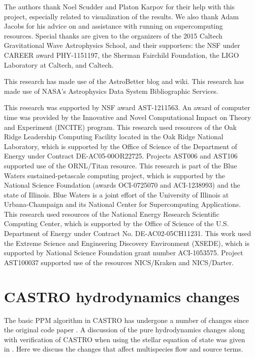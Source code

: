 \documentclass[iop]{../emulateapj}
\begin{document}
The authors thank Noel Scudder and Platon Karpov for their help with 
this project, especially related to visualization of the results. 
We also thank Adam Jacobs for his advice on and assistance with 
running on supercomputing resources. Special thanks are given 
to the organizers of the 2015 Caltech Gravitational Wave 
Astrophysics School, and their supporters: the NSF 
under CAREER award PHY-1151197, the Sherman Fairchild 
Foundation, the LIGO Laboratory at Caltech, and Caltech.

This research has made use of the AstroBetter blog and wiki. 
This research has made use of NASA's Astrophysics Data System 
Bibliographic Services.

This research was supported by NSF award AST-1211563. An
award of computer time was provided by the Innovative and Novel
Computational Impact on Theory and Experiment (INCITE) program.  This
research used resources of the Oak Ridge Leadership Computing Facility
located in the Oak Ridge National Laboratory, which is supported by
the Office of Science of the Department of Energy under Contract
DE-AC05-00OR22725. Projects AST006 and AST106 supported use of the ORNL/Titan resource. 
This research is part of the Blue Waters sustained-petascale computing project, 
which is supported by the National Science Foundation (awards OCI-0725070 
and ACI-1238993) and the state of Illinois. Blue Waters is a joint 
effort of the University of Illinois at Urbana-Champaign and its 
National Center for Supercomputing Applications.
This research used resources of the National Energy Research Scientific Computing
Center, which is supported by the Office of Science of the
U.S. Department of Energy under Contract No. DE-AC02-05CH11231.  
This work used the Extreme Science and Engineering Discovery Environment (XSEDE), 
which is supported by National Science Foundation grant number ACI-1053575. 
Project AST100037 supported use of the resources NICS/Kraken and NICS/Darter.

\clearpage

\appendix

\section{CASTRO hydrodynamics changes}

The basic PPM algorithm in CASTRO has undergone a number of changes
since the original code paper \citep{castro}.  A discussion of the
pure hydrodynamics changes along with verification of CASTRO when
using the stellar equation of state was given in
\citet{zingalekatz:2015}.  Here we discuss the changes that affect
multispecies flow and source terms.
\end{document}
